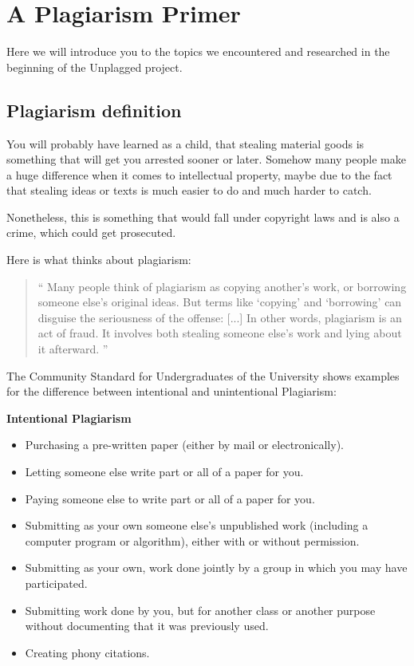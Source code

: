﻿\chapter{A Plagiarism Primer}\label{chap:plagOverview}

Here we will introduce you to the topics we encountered and researched in the beginning of the Unplagged project.

\section{Plagiarism definition}


You will probably have learned as a child, that stealing material goods is something that will get you arrested sooner or
later. Somehow many people make a huge difference when it comes to intellectual property, maybe due to the fact that 
stealing ideas or texts is much easier to do and much harder to catch.

Nonetheless, this is something that would fall under copyright laws and is also a crime, which could get prosecuted.

Here is what \citet{PlagiarismDotOrg} thinks about plagiarism:

\begin{quote}\enquote{
Many people think of plagiarism as copying another's work, or borrowing someone else's original ideas. But terms like 
\enquote{copying} and \enquote{borrowing} can disguise the seriousness of the offense: [...] In other words, plagiarism 
is an act of fraud. It involves both stealing someone else's work and lying about it afterward.
}
\end{quote}

The Community Standard for Undergraduates of the \citet{DukeSite} University  shows examples for the difference between intentional and unintentional Plagiarism:

\textbf{Intentional Plagiarism}


\begin{itemize}
\item Purchasing a pre-written paper (either by mail or electronically).
\item    Letting someone else write part or all of a paper for you.
\item    Paying someone else to write part or all of a paper for you.
\item    Submitting as your own someone else's unpublished work (including a computer program or algorithm), either with or without permission.
\item    Submitting as your own, work done jointly by a group in which you may have participated.
\item    Submitting work done by you, but for another class or another purpose without documenting that it was previously used.
\item    Creating phony citations.
\end{itemize}

